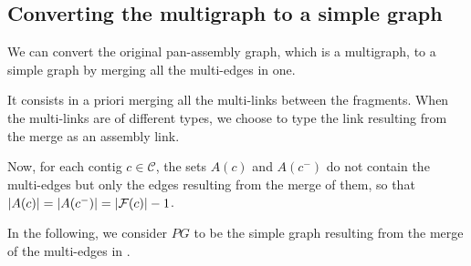 \subsection{Converting the multigraph to a simple graph}

We can convert the original pan-assembly graph, which is a multigraph, to a simple graph by merging all the multi-edges in one.

It consists in a priori merging all the multi-links between the fragments.
When the multi-links are of different types, we choose to type the link resulting from the merge as an assembly link.

\begin{notebox}
  Now, for each contig \(c \in \mathcal{C}\), the sets \(A(c)\) and \(A(c^-)\) do not contain the multi-edges but only the edges resulting from the merge of them, so that \(|A(c)| = |A(c^-)| = |\mathcal{F}{}(c)| - 1\).
\end{notebox}

In the following, we consider \(PG\) to be the simple graph resulting from the merge of the multi-edges in \ELinks{}.
